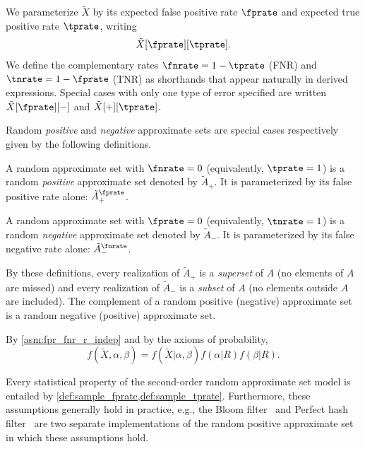 We parameterize $\tilde{X}$ by its expected false positive rate $\fprate$ and expected true positive rate $\tprate$, writing
\begin{equation}
\tilde{X}[\fprate][\tprate].
\end{equation}
We define the complementary rates $\fnrate = 1-\tprate$ (FNR) and $\tnrate = 1-\fprate$ (TNR) as shorthands that appear naturally in derived expressions.
Special cases with only one type of error specified are written $\tilde{X}[\fprate][-]$ and $\tilde{X}[+][\tprate]$.

Random \emph{positive} and \emph{negative} approximate sets are special cases respectively given by the following definitions.
\begin{definition}
\label{def:pos_approx_set}
A random approximate set with $\fnrate = 0$ (equivalently, $\tprate = 1$) is a random \emph{positive} approximate set denoted by $\tilde{A}_+$.
It is parameterized by its false positive rate alone: $\tilde{A}_+^\fprate$.
\end{definition}
\begin{definition}
\label{def:neg_approx_set}
A random approximate set with $\fprate = 0$ (equivalently, $\tnrate = 1$) is a random \emph{negative} approximate set denoted by $\tilde{A}_-$.
It is parameterized by its false negative rate alone: $\tilde{A}_-^\fnrate$.
\end{definition}
By these definitions, every realization of $\tilde{A}_+$ is a \emph{superset} of $A$ (no elements of $A$ are missed) and every realization of $\tilde{A}_-$ is a \emph{subset} of $A$ (no elements outside $A$ are included).
The complement of a random positive (negative) approximate set is a random negative (positive) approximate set.

By \cref{asm:fpr_fnr_r_indep} and by the axioms of probability,
\begin{equation}
f(\tilde{X}, \alpha, \beta) =
f(\tilde{X} | \alpha, \beta)
f(\alpha | R) f(\beta | R).
\end{equation}

Every statistical property of the second-order random approximate set model is entailed by \cref{def:sample_fprate,def:sample_tprate}.
Furthermore, these assumptions generally hold in practice, e.g., the Bloom filter~\cite{bf} and Perfect hash filter~\cite{phf} are two separate implementations of the random positive approximate set in which these assumptions hold.

